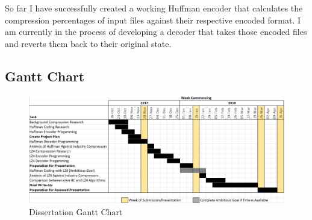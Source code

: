 \documentclass[12pt]{article}
\begin{document}
	So far I have successfully created a working Huffman encoder that calculates the compression percentages of input files against their respective encoded format. I am currently in the process of developing a decoder that takes those encoded files and reverts them back to their original state.
	
	\subsection{Gantt Chart}
	
	\begin{figure}[H]
		\centering
		\includegraphics[angle=270, scale=0.5]{../Images/Dissertation_Gantt_Chart.png}
		\caption{Dissertation Gantt Chart}
		\label{fig:gantt_chart}
	\end{figure}

\clearpage


\end{document}
